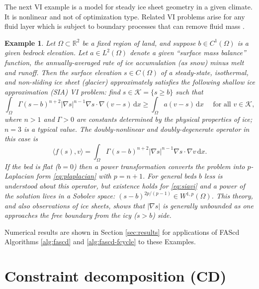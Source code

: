 \documentclass[letterpaper,final,12pt,reqno]{amsart}
\theoremstyle{cstyle}
\theoremstyle{cstyle*}
\theoremstyle{dstyle}
\newtheorem{example}[theorem]{Example}
\numberwithin{equation}{section}
\numberwithin{figure}{section}
\numberwithin{table}{section}
\numberwithin{theorem}{section}
\newcommand{\RR}{\mathbb{R}}
\newcommand{\grad}{\nabla}
\newcommand{\ip}[2]{\langle#1,#2\rangle}
\newcommand{\dx}{\, \mathrm{d}x}
\begin{document}
The next VI example is a model for steady ice sheet geometry in a given climate. It is nonlinear and not of optimization type. Related VI problems arise for any fluid layer which is subject to boundary processes that can remove fluid mass \cite{Bueler2021conservation}.

\begin{example}  \label{ex:sia}  Let $\Omega \subset \RR^2$ be a fixed region of land, and suppose $b \in C^1(\Omega)$ is a given bedrock elevation.  Let $a \in L^2(\Omega)$ denote a given ``surface mass balance'' function, the annually-averaged rate of ice accumulation (as snow) minus melt and runoff.  Then the surface elevation $s\in C(\Omega)$ of a steady-state, isothermal, and non-sliding ice sheet (glacier) approximately satisfies the following \emph{shallow ice approximation} (SIA) \cite{GreveBlatter2009} VI problem: find $s \in \mathcal{K} = \{s\ge b\}$ such that
\begin{equation}
\int_\Omega \Gamma (s-b)^{n+2} |\grad s|^{n-1} \grad s \cdot \grad (v-s) \dx \ge \int_\Omega a (v-s)\dx \quad \text{ for all } v \in \mathcal{K}, \label{eq:siavi}
\end{equation}
where $n>1$ and $\Gamma>0$ are constants determined by the physical properties of ice; $n=3$ is a typical value.  The doubly-nonlinear and doubly-degenerate operator in this case is
\begin{equation}
\ip{f(s)}{v} = \int_\Omega \Gamma (s-b)^{n+2} |\grad s|^{n-1} \grad s \cdot \grad v\dx. \label{eq:sia}
\end{equation}
If the bed is flat ($b=0$) then a power transformation converts the problem into $p$-Laplacian form \eqref{eq:plaplacian} with $p=n+1$.  For general beds $b$ less is understood about this operator, but existence holds for \eqref{eq:siavi} \cite{JouvetBueler2012} and a power of the solution lives in a Sobolev space: $(s-b)^{2p/(p-1)} \in W^{1,p}(\Omega)$.  This theory, and also observations of ice sheets, shows that $|\grad s|$ is generally unbounded as one approaches the free boundary from the icy ($s>b$) side.
\end{example}

Numerical results are shown in Section \ref{sec:results} for applications of FAScd Algorithms \ref{alg:fascd} and \ref{alg:fascd-fcycle} to these Examples.


\section{Constraint decomposition (CD)} \label{sec:cd}
\end{document}
